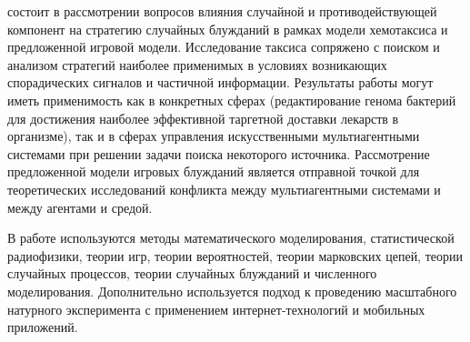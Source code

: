 {\influence} состоит в рассмотрении вопросов влияния случайной и противодействующей компонент на стратегию случайных блужданий в рамках модели хемотаксиса и предложенной игровой модели. Исследование таксиса сопряжено с поиском и анализом стратегий наиболее применимых в условиях возникающих спорадических сигналов и частичной информации. Результаты работы могут иметь применимость как в конкретных сферах (редактирование генома бактерий для достижения наиболее эффективной таргетной доставки лекарств в организме), так и в сферах управления искусственными мультиагентными системами при решении задачи поиска некоторого источника. Рассмотрение предложенной модели игровых блужданий является отправной точкой для теоретических исследований конфликта между мультиагентными системами и между агентами и средой.

{\methods} 
В работе используются методы математического моделирования, статистической радиофизики, теории игр, теории вероятностей, теории марковских цепей, теории случайных процессов, теории случайных блужданий и численного моделирования. Дополнительно используется подход к проведению масштабного натурного эксперимента с применением интернет-технологий и мобильных приложений.


